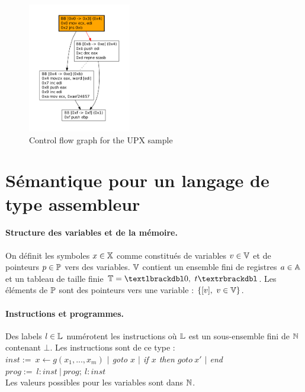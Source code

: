 \begin{figure}
\begin{center}
\includegraphics[width=0.4\textwidth]{supports/disasm/upx/upx.pdf}
\end{center}
\caption{Control flow graph for the UPX sample}
\label{fig:upx_cfg}
\end{figure}


\section{Sémantique pour un langage de type assembleur}

\paragraph{Structure des variables et de la mémoire.}

\begin{defi}
On définit les symboles $x\in\mathbb X$ comme constitués de variables $v\in\mathbb V$ et de pointeurs $p\in\mathbb P$ vers des variables. $\mathbb V$ contient un ensemble fini de registres $a\in\mathbb A$ et un tableau de taille finie $\mathbb{T}=\textlbrackdbl 0,\ t\textrbrackdbl$. Les éléments de $\mathbb P$ sont des pointeurs vers une variable : $\{[v],\ v\in \mathbb V\}$.
\end{defi}


\paragraph{Instructions et programmes.}
\begin{defi}
Des labels $l\in\mathbb L$ numérotent les instructions où $\mathbb L$ est un sous-ensemble fini de $\mathbb N$ contenant $\bot$. Les instructions sont de ce type : \\
$inst:=\ $\emph{$x\leftarrow g(x_1, ..., x_m)$ $|$ goto $x$ $|$ if $x$ then $goto\ x'$ $|$ end}\\
$prog:=\ $\emph{$l:inst\ |\ prog;\ l:inst$}\\
Les valeurs possibles pour les variables sont dans $\mathbb N$.
\end{defi}

